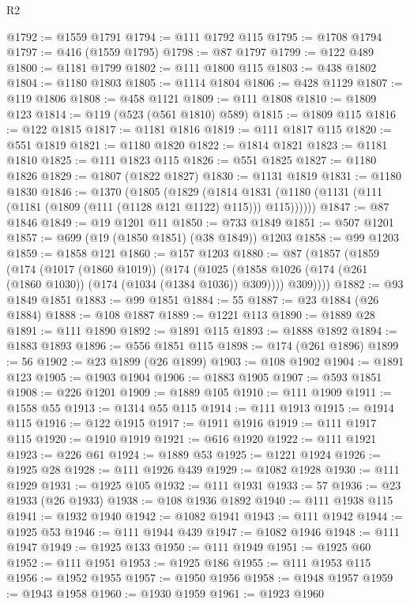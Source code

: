 \begin{lexlean}{R2}
\begin{coremodule}
@1792 := @1559 @1791
@1794 := @111 @1792 @115
@1795 := @1708 @1794
@1797 := @416 (@1559 @1795)
@1798 := @87 @1797
@1799 := @122 @489
@1800 := @1181 @1799
@1802 := @111 @1800 @115
@1803 := @438 @1802
@1804 := @1180 @1803
@1805 := @1114 @1804
@1806 := @428 @1129
@1807 := @119 @1806
@1808 := @458 @1121
@1809 := @111 @1808
@1810 := @1809 @123
@1814 := @119 (@523 (@561 @1810) @589)
@1815 := @1809 @115
@1816 := @122 @1815
@1817 := @1181 @1816
@1819 := @111 @1817 @115
@1820 := @551 @1819
@1821 := @1180 @1820
@1822 := @1814 @1821
@1823 := @1181 @1810
@1825 := @111 @1823 @115
@1826 := @551 @1825
@1827 := @1180 @1826
@1829 := @1807 (@1822 @1827)
@1830 := @1131 @1819
@1831 := @1180 @1830
@1846 := @1370
    (@1805
      (@1829
        (@1814 @1831 (@1180 (@1131 (@111 (@1181 (@1809 (@111 (@1128 @121 @1122) @115))) @115))))))
@1847 := @87 @1846
@1849 := @19 @1201 @11
@1850 := @733 @1849
@1851 := @507 @1201
@1857 := @699 (@19 (@1850 @1851) (@38 @1849)) @1203
@1858 := @99 @1203
@1859 := @1858 @121
@1860 := @157 @1203
@1880 := @87
    (@1857
      (@1859
        (@174
          (@1017 (@1860 @1019))
          (@174
            (@1025 (@1858 @1026 (@174 (@261 (@1860 @1030)) (@174 (@1034 (@1384 @1036)) @309))))
            @309))))
@1882 := @93 @1849 @1851
@1883 := @99 @1851
@1884 := 55
@1887 := @23 @1884 (@26 @1884)
@1888 := @108 @1887
@1889 := @1221 @113
@1890 := @1889 @28
@1891 := @111 @1890
@1892 := @1891 @115
@1893 := @1888 @1892
@1894 := @1883 @1893
@1896 := @556 @1851 @115
@1898 := @174 (@261 @1896)
@1899 := 56
@1902 := @23 @1899 (@26 @1899)
@1903 := @108 @1902
@1904 := @1891 @123
@1905 := @1903 @1904
@1906 := @1883 @1905
@1907 := @593 @1851
@1908 := @226 @1201
@1909 := @1889 @105
@1910 := @111 @1909
@1911 := @1558 @55
@1913 := @1314 @55 @115
@1914 := @111 @1913
@1915 := @1914 @115
@1916 := @122 @1915
@1917 := @1911 @1916
@1919 := @111 @1917 @115
@1920 := @1910 @1919
@1921 := @616 @1920
@1922 := @111 @1921
@1923 := @226 @61
@1924 := @1889 @53
@1925 := @1221 @1924
@1926 := @1925 @28
@1928 := @111 @1926 @439
@1929 := @1082 @1928
@1930 := @111 @1929
@1931 := @1925 @105
@1932 := @111 @1931
@1933 := 57
@1936 := @23 @1933 (@26 @1933)
@1938 := @108 @1936 @1892
@1940 := @111 @1938 @115
@1941 := @1932 @1940
@1942 := @1082 @1941
@1943 := @111 @1942
@1944 := @1925 @53
@1946 := @111 @1944 @439
@1947 := @1082 @1946
@1948 := @111 @1947
@1949 := @1925 @133
@1950 := @111 @1949
@1951 := @1925 @60
@1952 := @111 @1951
@1953 := @1925 @186
@1955 := @111 @1953 @115
@1956 := @1952 @1955
@1957 := @1950 @1956
@1958 := @1948 @1957
@1959 := @1943 @1958
@1960 := @1930 @1959
@1961 := @1923 @1960

\end{coremodule}
\end{lexlean}
